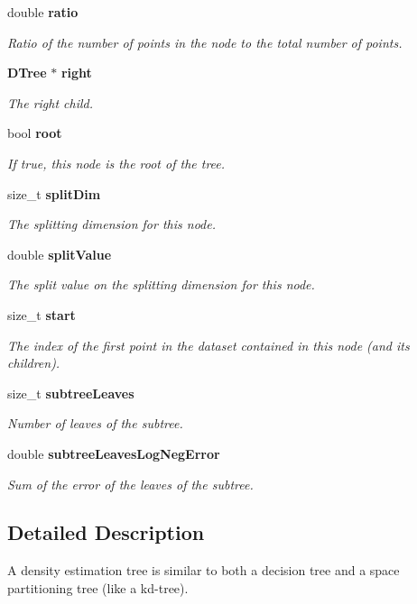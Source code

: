 \begin{DoxyCompactItemize}
double {\bf ratio}
\begin{DoxyCompactList}\small\item\em Ratio of the number of points in the node to the total number of points. \end{DoxyCompactList}\item 
{\bf D\-Tree} $\ast$ {\bf right}
\begin{DoxyCompactList}\small\item\em The right child. \end{DoxyCompactList}\item 
bool {\bf root}
\begin{DoxyCompactList}\small\item\em If true, this node is the root of the tree. \end{DoxyCompactList}\item 
size\-\_\-t {\bf split\-Dim}
\begin{DoxyCompactList}\small\item\em The splitting dimension for this node. \end{DoxyCompactList}\item 
double {\bf split\-Value}
\begin{DoxyCompactList}\small\item\em The split value on the splitting dimension for this node. \end{DoxyCompactList}\item 
size\-\_\-t {\bf start}
\begin{DoxyCompactList}\small\item\em The index of the first point in the dataset contained in this node (and its children). \end{DoxyCompactList}\item 
size\-\_\-t {\bf subtree\-Leaves}
\begin{DoxyCompactList}\small\item\em Number of leaves of the subtree. \end{DoxyCompactList}\item 
double {\bf subtree\-Leaves\-Log\-Neg\-Error}
\begin{DoxyCompactList}\small\item\em Sum of the error of the leaves of the subtree. \end{DoxyCompactList}\end{DoxyCompactItemize}


\subsection{Detailed Description}
A density estimation tree is similar to both a decision tree and a space partitioning tree (like a kd-\/tree). 

